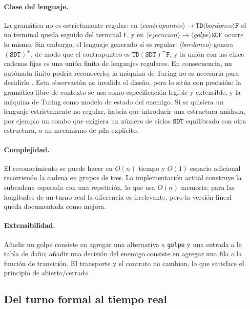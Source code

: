 \documentclass[9pt]{ieeeconf}
\newcommand{\tk}[1]{\texttt{#1}}
\begin{document}
\paragraph{Clase del lenguaje.} La gramática no es estrictamente regular: en $\langle contrapunteo\rangle\to\tk{TD}\langle bordoneo\rangle\tk{F}$ el no terminal queda seguido del terminal \tk{F}, y en $\langle ejecucion\rangle\to\langle golpe\rangle\tk{EOF}$ ocurre lo mismo. Sin embargo, el lenguaje generado sí es regular: $\langle bordoneo\rangle$ genera $(\tk{SDT})^+$, de modo que el contrapunteo es $\tk{TD}(\tk{SDT})^+\tk{F}$, y la unión con las cinco cadenas fijas es una unión finita de lenguajes regulares. En consecuencia, un autómata finito podría reconocerlo; la máquina de Turing no es necesaria para decidirlo \cite{sipser2012}. Esta observación no invalida el diseño, pero lo sitúa con precisión: la gramática libre de contexto se usa como especificación legible y extensible, y la máquina de Turing como modelo de estado del enemigo. Si se quisiera un lenguaje estrictamente no regular, habría que introducir una estructura anidada, por ejemplo un combo que exigiera un número de ciclos $\tk{SDT}$ equilibrado con otra estructura, o un mecanismo de pila explícito.

\paragraph{Complejidad.} El reconocimiento se puede hacer en $O(n)$ tiempo y $O(1)$ espacio adicional recorriendo la cadena en grupos de tres. La implementación actual construye la subcadena esperada con una repetición, lo que usa $O(n)$ memoria; para las longitudes de un turno real la diferencia es irrelevante, pero la versión lineal queda documentada como mejora.

\paragraph{Extensibilidad.} Añadir un golpe consiste en agregar una alternativa a \texttt{golpe} y una entrada a la tabla de daño; añadir una decisión del enemigo consiste en agregar una fila a la función de transición. El transporte y el contrato no cambian, lo que satisface el principio de abierto/cerrado \cite{gregory2018}.

\subsection{Del turno formal al tiempo real}
\label{sec:tiempo}
\end{document}
